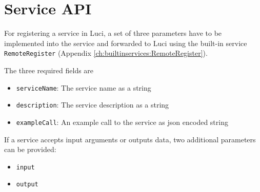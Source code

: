 \section{Service API}
\label{ch:serviceapi}

For registering a service in Luci, a set of three parameters have to be implemented into the service and forwarded to Luci using the built-in service \texttt{RemoteRegister} (Appendix \ref{ch:builtinservices:RemoteRegister}).

The three required fields are
\begin{itemize}
  \item \texttt{serviceName}: The service name as a string
  \item \texttt{description}: The service description as a string
  \item \texttt{exampleCall}: An example call to the service as json encoded string
\end{itemize}

If a service accepts input arguments or outputs data, two additional parameters can be provided:
\begin{itemize}
  \item \texttt{input}
  \item \texttt{output}
\end{itemize}
